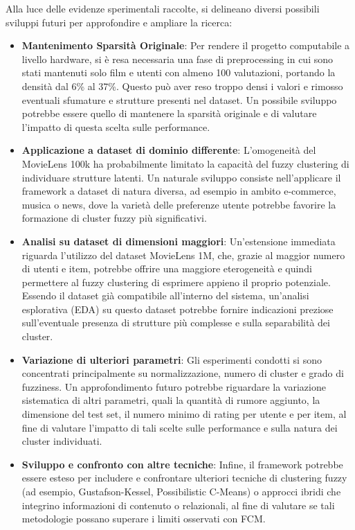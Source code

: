 Alla luce delle evidenze sperimentali raccolte, si delineano diversi possibili sviluppi futuri per approfondire e ampliare la ricerca:
\begin{itemize}
\item \textbf{Mantenimento Sparsità Originale}: Per rendere il progetto computabile a livello hardware, si è resa necessaria una fase di preprocessing in cui sono stati mantenuti solo film e utenti con almeno 100 valutazioni, portando la densità dal 6\% al 37\%. Questo può aver reso troppo densi i valori e rimosso eventuali sfumature e strutture presenti nel dataset. Un possibile sviluppo potrebbe essere quello di mantenere la sparsità originale e di valutare l'impatto di questa scelta sulle performance.
\item \textbf{Applicazione a dataset di dominio differente}: L'omogeneità del MovieLens 100k ha probabilmente limitato la capacità del fuzzy clustering di individuare strutture latenti. Un naturale sviluppo consiste nell'applicare il framework a dataset di natura diversa, ad esempio in ambito e-commerce, musica o news, dove la varietà delle preferenze utente potrebbe favorire la formazione di cluster fuzzy più significativi.
\item \textbf{Analisi su dataset di dimensioni maggiori}: Un'estensione immediata riguarda l'utilizzo del dataset MovieLens 1M, che, grazie al maggior numero di utenti e item, potrebbe offrire una maggiore eterogeneità e quindi permettere al fuzzy clustering di esprimere appieno il proprio potenziale. Essendo il dataset già compatibile all'interno del sistema, un'analisi esplorativa (EDA) su questo dataset potrebbe fornire indicazioni preziose sull'eventuale presenza di strutture più complesse e sulla separabilità dei cluster.
\item \textbf{Variazione di ulteriori parametri}: Gli esperimenti condotti si sono concentrati principalmente su normalizzazione, numero di cluster e grado di fuzziness. Un approfondimento futuro potrebbe riguardare la variazione sistematica di altri parametri, quali la quantità di rumore aggiunto, la dimensione del test set, il numero minimo di rating per utente e per item, al fine di valutare l'impatto di tali scelte sulle performance e sulla natura dei cluster individuati.
\item \textbf{Sviluppo e confronto con altre tecniche}: Infine, il framework potrebbe essere esteso per includere e confrontare ulteriori tecniche di clustering fuzzy (ad esempio, Gustafson-Kessel, Possibilistic C-Means) o approcci ibridi che integrino informazioni di contenuto o relazionali, al fine di valutare se tali metodologie possano superare i limiti osservati con FCM.
\end{itemize}
